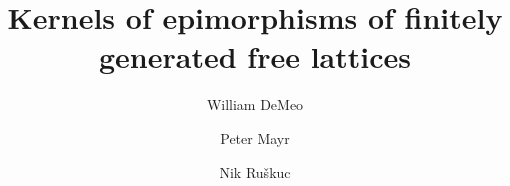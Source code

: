 \usepackage{pdfcomment}
\usepackage{color}
\usepackage{amsmath}
\usepackage{amssymb}
\usepackage{amsfonts}
\usepackage{mathtools}
\usepackage{amscd}
\usepackage{inputs/wjdlatexmacs}

\usepackage[mathcal]{euscript}
\usepackage{comment}
\usepackage{tikz}
\usetikzlibrary{math} %

\renewcommand{\th}[2]{#1\mathrel{\theta}#2}
\newcommand{\infixrel}[3]{#2\mathrel{#1}#3}


\newtheorem{theorem}{Theorem}
\newtheorem{lemma}[theorem]{Lemma}
\newtheorem{corollary}[theorem]{Corollary}
\newtheorem{prop}[theorem]{Proposition}
\newtheorem{conjecture}[theorem]{Conjecture}
\theoremstyle{definition}
\newtheorem{definition}[theorem]{Definition}
\newtheorem{example}[theorem]{Example}
\newtheorem{fact}[theorem]{Fact}
\newtheorem{remark}{Remark}
\newtheorem*{remarks}{Remarks}
\newtheorem*{rem}{Remark}
\newtheorem{prob}{Problem}



\title[Kernels of Lattice Epimorphisms]{Kernels of epimorphisms of finitely generated free lattices}
\author[W.~DeMeo]{William DeMeo}

\author[P.~Mayr]{Peter Mayr}

\author[N.~Ru\v{s}kuc]{Nik Ru\v{s}kuc}

